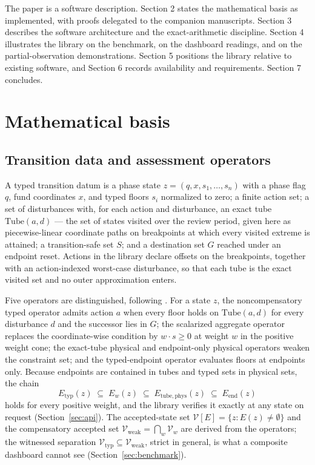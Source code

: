 \documentclass[3p,11pt]{elsarticle}
\begin{document}
The paper is a software description. Section 2 states the mathematical basis
as implemented, with proofs delegated to the companion manuscripts.
Section 3 describes the software architecture and the exact-arithmetic
discipline. Section 4 illustrates the library on the benchmark, on the
dashboard readings, and on the partial-observation demonstrations. Section 5
positions the library relative to existing software, and Section 6 records
availability and requirements. Section 7 concludes.

\section{Mathematical basis}\label{sec:math}

\subsection{Transition data and assessment operators}\label{sec:operators}

A typed transition datum is a phase state $z = (q, x, s_1, \dots, s_n)$ with
a phase flag $q$, fund coordinates $x$, and typed floors $s_i$ normalized to
zero; a finite action set; a set of disturbances with, for each action and
disturbance, an exact tube $\mathrm{Tube}(a, d)$ --- the set of states
visited over the review period, given here as piecewise-linear coordinate
paths on breakpoints at which every visited extreme is attained; a
transition-safe set $S$; and a destination set $G$ reached under an endpoint
reset. Actions in the library declare offsets on the breakpoints, together
with an action-indexed worst-case disturbance, so that each tube is the
exact visited set and no outer approximation enters.

Five operators are distinguished, following \citet{Abaee2026a}. For a state $z$,
the noncompensatory typed operator admits action $a$ when every floor holds
on $\mathrm{Tube}(a, d)$ for every disturbance $d$ and the successor lies in
$G$; the scalarized aggregate operator replaces the coordinate-wise
condition by $w \cdot s \geq 0$ at weight $w$ in the positive weight cone;
the exact-tube physical and endpoint-only physical operators weaken the
constraint set; and the typed-endpoint operator evaluates floors at
endpoints only. Because endpoints are contained in tubes and typed sets in
physical sets, the chain
\[
E_{\mathrm{typ}}(z) \;\subseteq\; E_w(z) \;\subseteq\;
E_{\mathrm{tube,phys}}(z) \;\subseteq\; E_{\mathrm{end}}(z)
\]
holds for every positive weight, and the library verifies it exactly at any
state on request (Section~\ref{sec:api}). The accepted-state set
$\mathcal{V}[E] = \{ z : E(z) \neq \emptyset \}$ and the compensatory
accepted set $\mathcal{V}_{\mathrm{weak}} = \bigcap_w \mathcal{V}_w$ are
derived from the operators; the witnessed separation
$\mathcal{V}_{\mathrm{typ}} \subseteq \mathcal{V}_{\mathrm{weak}}$, strict in
general, is what a composite dashboard cannot see (Section~\ref{sec:benchmark}).
\end{document}
